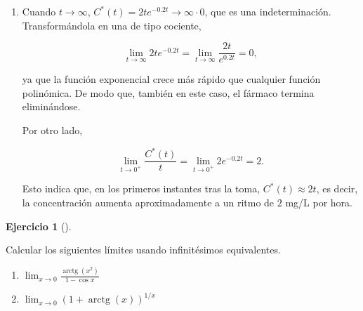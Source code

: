 \documentclass[
  spanish,
  a4paper,
]{scrreport}
\theoremstyle{definition}
\newtheorem{exercise}{Ejercicio}[chapter]
\theoremstyle{remark}
\begin{document}
\begin{tcolorbox}
\begin{enumerate}
  \[
  \lim_{k\to 0.2}\frac{10ke^{-kt}\left(e^{(k-0.2)t}-1\right)}{k-0.2} = \lim_{k\to 0.2}\frac{10ke^{-kt}(k-0.2)t}{k-0.2} = \lim_{k\to 0.2}10kte^{-kt} = 2te^{-0.2t}.
  \]

  Para \(t=0\), \(C(0) = 0\) para todo \(k\), por lo que el límite
  también es \(0 = 2\cdot 0\cdot e^0\). Así pues,

  \[
  C^*(t) = 2te^{-0.2t}, \quad t\geq 0.
  \]
\item
  Cuando \(t\to\infty\), \(C^*(t) = 2te^{-0.2t}\to\infty\cdot 0\), que
  es una indeterminación. Transformándola en una de tipo cociente,

  \[
  \lim_{t\to\infty}2te^{-0.2t} = \lim_{t\to\infty}\frac{2t}{e^{0.2t}} = 0,
  \]

  ya que la función exponencial crece más rápido que cualquier función
  polinómica. De modo que, también en este caso, el fármaco termina
  eliminándose.

  Por otro lado,

  \[
  \lim_{t\to 0^+}\frac{C^*(t)}{t} = \lim_{t\to 0^+}2e^{-0.2t} = 2.
  \]

  Esto indica que, en los primeros instantes tras la toma,
  \(C^*(t)\approx 2t\), es decir, la concentración aumenta
  aproximadamente a un ritmo de \(2\) mg/L por hora.
\end{enumerate}

\end{tcolorbox}

\begin{exercise}[]\protect\hypertarget{exr-4}{}\label{exr-4}

Calcular los siguientes límites usando infinitésimos equivalentes.

\begin{enumerate}
\def\labelenumi{\alph{enumi}.}
\item
  \(\lim_{x\to 0}\frac{\operatorname{arctg}(x^2)}{1-\cos x}\)
\item
  \(\lim_{x\to 0}\left(1+\operatorname{arctg}(x)\right)^{1/x}\)
\end{enumerate}

\end{exercise}
\end{document}
